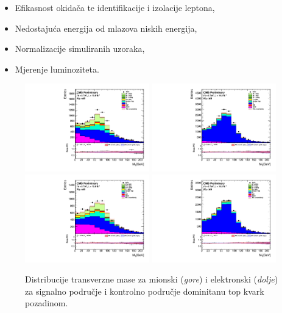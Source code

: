 \begin{otherlanguage}{croatian}
\begin{itemize}
\item Efikasnost okidača te identifikacije i izolacije leptona,
\item Nedostajuća energija od mlazova niskih energija,
\item Normalizacije simuliranih uzoraka,
\item Mjerenje luminoziteta.
\end{itemize}
\begin{figure}[htbp]
	\centering
		\includegraphics[width=0.48\textwidth]{Figures/Results/Muon/prefit/Wbb_GetVMt_doQCD1.pdf}
		\includegraphics[width=0.48\textwidth]{Figures/Results/Muon/prefit/TT_GetVMt_doQCD1.pdf}
		\includegraphics[width=0.48\textwidth]{Figures/Results/Electron/prefit/Wbb_GetVMt_doQCD1.pdf}
		\includegraphics[width=0.48\textwidth]{Figures/Results/Electron/prefit/TT_GetVMt_doQCD1.pdf}
	\caption[Transverse mass distributions]{Distribucije transverzne mase za mionski (\textit{gore}) i elektronski (\textit{dolje}) za signalno područje i kontrolno područje dominitanu top kvark pozadinom.}
	\label{fig:mt_hr}
\end{figure}


\end{otherlanguage}
